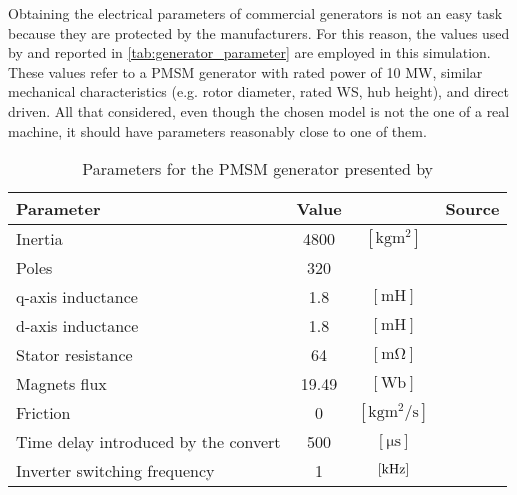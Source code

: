  Obtaining the electrical parameters of commercial generators is not an easy task because they are protected by the manufacturers. For this reason, the values used by \cite{10-MW_Direct-Drive_PMSG-Based_Wind_Energy_Conversion_System_Model} and reported in \autoref{tab:generator_parameter} are employed in this simulation. These values refer to a PMSM generator with rated power of 10 MW, similar mechanical characteristics (e.g. rotor diameter, rated WS, hub height), and direct driven. All that considered, even though the chosen model is not the one of a real machine, it should have parameters reasonably close to one of them.  

\begin{table}[htb]
    \caption{Parameters for the \acrlong{PMSM} generator presented by \cite{10-MW_Direct-Drive_PMSG-Based_Wind_Energy_Conversion_System_Model}}
    \centering
    \begin{tabular}{lccc}
    \toprule
    Parameter & Value & & Source\\ \midrule
    Inertia & 4800 & $\left[\si{\kilo\gram\square\meter}\right]$ & \cite{the_switch_datasheet} \\ \midrule	
    Poles & 320 & & \multirow{5}{*}{\cite{10-MW_Direct-Drive_PMSG-Based_Wind_Energy_Conversion_System_Model}} \\
    q-axis inductance & 1.8 & $\left[\si{\milli\henry}\right]$ & \\
    d-axis inductance & 1.8 & $\left[\si{\milli\henry}\right]$ &\\
    Stator resistance & 64 & $\left[\si{\milli\ohm}\right]$ &\\
    Magnets flux & 19.49 & $\left[\si{\weber}\right]$ &\\ \midrule
    Friction & 0 & $\left[\si{\kilo\gram\square\meter\per\second}\right]$ & \\
    Time delay introduced by the convert & 500 & $\left[\si{\micro\second}\right]$ & \\
    Inverter switching frequency & 1 & $\left[\si{\kilo\hertz}\right]$ & \\
    \bottomrule
    \end{tabular}
    \label{tab:generator_parameter}
\end{table}

